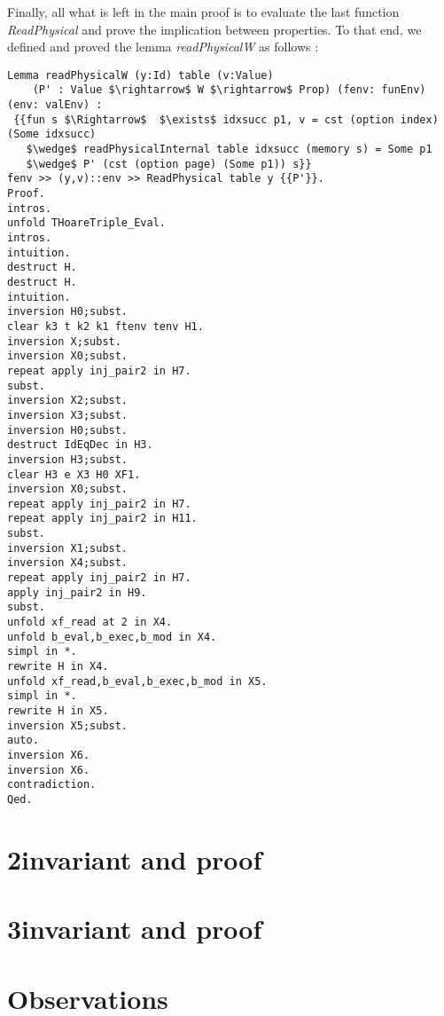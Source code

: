Finally, all what is left in the main proof is to evaluate the last function \textit{ReadPhysical} and prove the implication between properties. To that end, we defined and proved the lemma \textit{readPhysicalW} as follows : 
\begin{lstlisting}[caption = {readPhysicalW Lemma definition and proof}, xleftmargin=-.08\textwidth,
xrightmargin=-.08\textwidth,mathescape=true]
Lemma readPhysicalW (y:Id) table (v:Value) 
	(P' : Value $\rightarrow$ W $\rightarrow$ Prop) (fenv: funEnv) (env: valEnv) :
 {{fun s $\Rightarrow$  $\exists$ idxsucc p1, v = cst (option index) (Some idxsucc)
   $\wedge$ readPhysicalInternal table idxsucc (memory s) = Some p1 
   $\wedge$ P' (cst (option page) (Some p1)) s}} 
fenv >> (y,v)::env >> ReadPhysical table y {{P'}}.
Proof.
intros.
unfold THoareTriple_Eval.
intros.
intuition.
destruct H.
destruct H.
intuition.
inversion H0;subst.
clear k3 t k2 k1 ftenv tenv H1.
inversion X;subst.
inversion X0;subst.
repeat apply inj_pair2 in H7.
subst.
inversion X2;subst.
inversion X3;subst.
inversion H0;subst.
destruct IdEqDec in H3.
inversion H3;subst.
clear H3 e X3 H0 XF1. 
inversion X0;subst.
repeat apply inj_pair2 in H7.
repeat apply inj_pair2 in H11.
subst.
inversion X1;subst.
inversion X4;subst.
repeat apply inj_pair2 in H7.
apply inj_pair2 in H9.
subst.
unfold xf_read at 2 in X4.
unfold b_eval,b_exec,b_mod in X4.
simpl in *.
rewrite H in X4.
unfold xf_read,b_eval,b_exec,b_mod in X5.
simpl in *.
rewrite H in X5.
inversion X5;subst.
auto.
inversion X6.
inversion X6.
contradiction.
Qed.
\end{lstlisting} \vspace{4pt}

\section{2\nd invariant and proof}

\section{3\rd invariant and proof}

\section{Observations}
